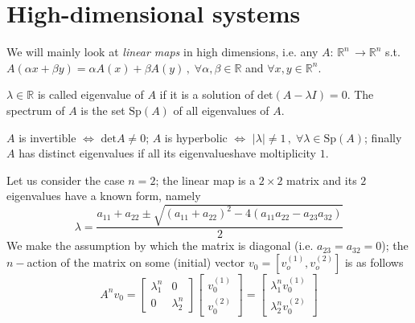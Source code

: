 \documentclass[../main.tex]{subfiles}
\begin{document}
     \section{High-dimensional systems}\label{sec3}
     We will mainly look at \textit{linear maps} in high dimensions, i.e. any $A:\,\mathbb{R}^{n}\,\to \mathbb{R}^{n}$ s.t. $A(\alpha x + \beta y)=\alpha A(x) + \beta A(y)\,,\;\forall \alpha,\beta\in \mathbb{R}$ and $\forall x,y\in \mathbb{R}^{n}$.
     \begin{definition}[Spectrum]\label{def1}
          $\lambda\in \mathbb{R}$ is called eigenvalue of $A$ if it is a solution of $\text{det}(A-\lambda I)=0$. The spectrum of $A$ is the set $\text{Sp}(A)$ of all eigenvalues of $A$.
     \end{definition}
     \begin{definition}[]\label{def2}
          $A$ is invertible $\iff$ $\text{det}A\neq0$; $A$ is hyperbolic $\iff$ $|\lambda|\neq1\,,\;\forall \lambda\in \text{Sp}(A)$; finally $A$ has distinct eigenvalues if all its eigenvalueshave moltiplicity $1$.
     \end{definition}
    Let us consider the case $n=2$; the linear map is a $2\times2$ matrix and its $2$ eigenvalues have a known form, namely
    \begin{equation}\label{eq1}
            \lambda=\frac{a_{11}+a_{22}\pm\sqrt{(a_{11}+a_{22})^{2}-4(a_{11}a_{22}-a_{23}a_{32})}}{2}
    \end{equation}
    We make the assumption by which the matrix is diagonal (i.e. $a_{23}=a_{32}=0$); the $n-$action of the matrix on some (initial) vector $v_{0}=[v_{o}^{(1)},v_{o}^{(2)}]$ is as follows
    \begin{equation}\label{eq3}
          A^{n}v_{0}=
          \begin{bmatrix}
                  \lambda_{1}^{n} & 0 \\
                  0 & \lambda_{2}^{n}
          \end{bmatrix}
          \begin{bmatrix}
                  v_{0}^{(1)} \\
                  v_{0}^{(2)}
          \end{bmatrix}
          = 
          \begin{bmatrix}
               \lambda_{1}^{n}v_{0}^{(1)} \\
               \lambda_{2}^{n}v_{0}^{(2)}
          \end{bmatrix}
    \end{equation}
\end{document}
